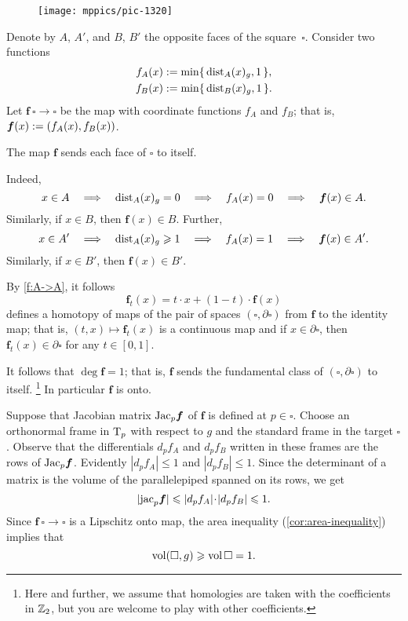 \begin{wrapfigure}{r}{30mm}
\vskip-0mm
\centering
\texttt{[image: mppics/pic-1320]}
\end{wrapfigure}

Denote by $A$, $A'$, and $B$, $B'$ the opposite faces of the square~$\square$.
Consider two functions
\begin{align*}
f_A(x)&\mathrel{:=}\min\{\,\mathrm{dist}_A(x)_g,1\,\},
\\
f_B(x)&\mathrel{:=}\min\{\,\mathrm{dist}_B(x)_g,1\,\}.
\end{align*}
Let $\bm{f}\:\square\to\square$ be the map with coordinate functions $f_A$ and $f_B$;
that is, $\bm{f}(x)\mathrel{:=}(f_A(x), f_B(x))$.

\begin{clm}{}\label{f:A->A}
The map $\bm{f}$ sends each face of $\square$ to itself.
\end{clm}


Indeed, 
\[x\in A \quad\Longrightarrow\quad \mathrm{dist}_A(x)_g=0 \quad\Longrightarrow\quad f_A(x)=0 \quad\Longrightarrow\quad \bm{f}(x)\in A.\]
Similarly, if $x\in B$, then $\bm{f}(x)\in B$.
Further, 
\[x\in A'
\quad\Longrightarrow\quad 
\mathrm{dist}_A(x)_g\geqslant 1 
\quad\Longrightarrow\quad 
f_A(x)=1 
\quad\Longrightarrow\quad 
\bm{f}(x)\in A'.\]
Similarly, if $x\in B'$, then $\bm{f}(x)\in B'$.

By \ref{f:A->A}, it follows 
\[\bm{f}_t(x)= t\cdot x + (1-t)\cdot \bm{f}(x)\]
defines a homotopy of maps of the pair of spaces $(\square,\partial \square)$ from $\bm{f}$ to the identity map;
that is, $(t,x)\mapsto \bm{f}_t(x)$ is a continuous map and if $x\in \partial \square$, then $\bm{f}_t(x)\in \partial \square$ for any $t\in [0,1]$.

It follows that $\deg\bm{f}=1$; that is, $\bm{f}$ sends the fundamental class of $(\square,\partial \square)$ to itself.%
\footnote{Here and further, we assume that homologies are taken with the coefficients in $\mathbb{Z}_2$, but you are welcome to play with other coefficients.}
In particular $\bm{f}$ is onto.

Suppose that Jacobian  matrix $\mathrm{Jac}_p\bm{f}$ of $\bm{f}$ is defined at $p\in \square$.
Choose an orthonormal frame in $\mathrm{T}_p$ with respect to $g$ and the standard frame in the target $\square$.
Observe that the differentials $d_pf_A$ and $d_pf_B$ written in these frames are the rows of $\mathrm{Jac}_p\bm{f}$.
Evidently $|d_pf_A|\le 1$ and $|d_pf_B|\le 1$.
Since the determinant of a matrix is the volume of the parallelepiped spanned on its rows, we get 
\[|\jac_p \bm{f}|\le |d_pf_A|\cdot|d_pf_B|\le 1.\]
Since $\bm{f}\:\square\to\square$ is a Lipschitz onto map, the area inequality (\ref{cor:area-inequality}) implies that 
\[\operatorname{\rm vol}\nolimits(\square,g)\geqslant \operatorname{\rm vol}\nolimits\square=1.\]
\qedsf

